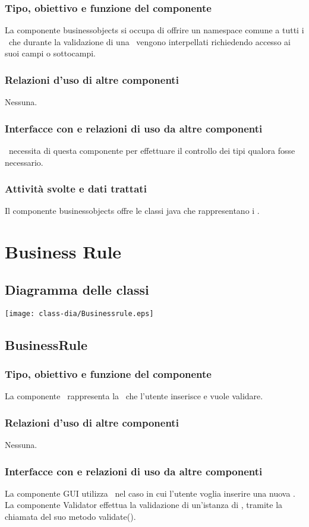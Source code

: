 \subsubsection{Tipo, obiettivo e funzione del componente}
La componente businessobjects si occupa di offrire un namespace comune a tutti i \bos\ che durante la validazione di una \br\ vengono interpellati richiedendo accesso ai suoi campi o sottocampi.
\subsubsection{Relazioni d'uso di altre componenti}
Nessuna.
\subsubsection{Interfacce con e relazioni di uso da altre componenti}
\brp\ necessita di questa componente per effettuare il controllo dei tipi qualora fosse necessario.
\subsubsection{Attivit\`a svolte e dati trattati}
Il componente businessobjects offre le classi java che rappresentano i \bos.

\section{Business Rule}
\subsection{Diagramma delle classi}
\begin{center}
\texttt{[image: class-dia/Businessrule.eps]}
\end{center}
\subsection{BusinessRule}
\subsubsection{Tipo, obiettivo e funzione del componente}
La componente \BR\ rappresenta la \br\ che l'utente inserisce e vuole validare.
\subsubsection{Relazioni d'uso di altre componenti}
Nessuna.
\subsubsection{Interfacce con e relazioni di uso da altre componenti}
La componente GUI utilizza \BR\ nel caso in cui l'utente voglia inserire una nuova \br.
La componente Validator effettua la validazione di un'istanza di \BR, tramite la chiamata del suo metodo validate().
